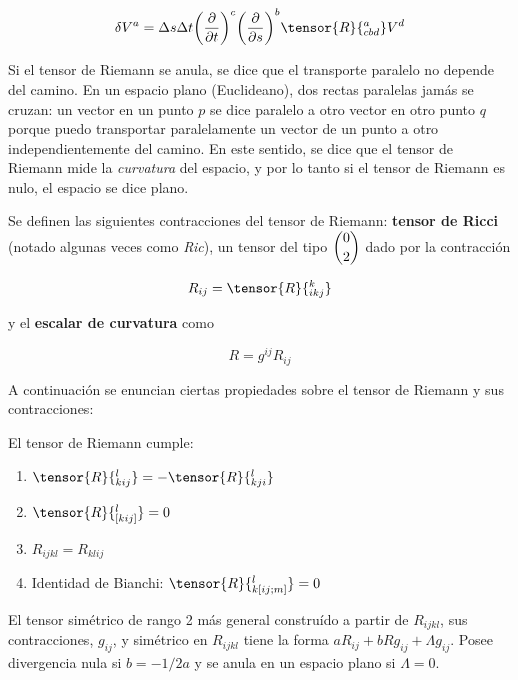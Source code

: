 \begin{equation*}
    \delta V^a=\Delta s\Delta t\bigg(\frac{\partial}{\partial t}\bigg)^c\bigg(\frac{\partial}{\partial s}\bigg)^b\tensor{R}{_{cbd}^a}V^d
\end{equation*}

Si el tensor de Riemann se anula, se dice que el transporte paralelo no depende del camino. En un espacio plano (Euclideano), dos rectas paralelas jamás se cruzan: un vector en un punto $p$ se dice paralelo a otro vector en otro punto $q$ porque puedo transportar paralelamente un vector de un punto a otro independientemente del camino. En este sentido, se dice que el tensor de Riemann mide la \textit{curvatura} del espacio, y por lo tanto si el tensor de Riemann es nulo, el espacio se dice plano.

Se definen las siguientes contracciones del tensor de Riemann: \textbf{tensor de Ricci} (notado algunas veces como \textit{Ric}), un tensor del tipo $\dbinom{0}{2}$ dado por la contracción

\begin{equation*}
    R_{ij}=\tensor{R}{^k_{ikj}}
\end{equation*}

y el \textbf{escalar de curvatura} como

\begin{equation*}
    R=g^{ij}R_{ij}
\end{equation*}

A continuación se enuncian ciertas propiedades sobre el tensor de Riemann y sus contracciones:

\begin{lemma}
El tensor de Riemann cumple:
    \begin{enumerate}[{1)}]
        \item $\tensor{R}{^l_{kij}}=-\tensor{R}{^l_{kji}}$
        \item $\tensor{R}{^l_{[kij]}}=0$
        \item $R_{ijkl}=R_{klij}$
        \item Identidad de Bianchi: $\tensor{R}{^l_{k[ij;m]}}=0$
    \end{enumerate}
\end{lemma}

\begin{lemma}
El tensor simétrico de rango 2 más general construído a partir de $R_{ijkl}$, sus contracciones, $g_{ij}$, y simétrico en $R_{ijkl}$ tiene la forma $aR_{ij}+bRg_{ij}+\Lambda g_{ij}$. Posee divergencia nula si $b=-1/2a$ y se anula en un espacio plano si $\Lambda=0$.
\end{lemma}

